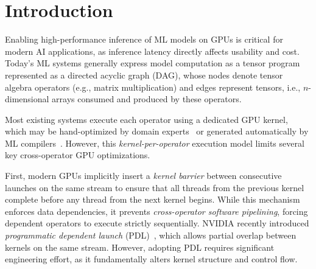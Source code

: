 \section{Introduction}
\label{sec:intro}
Enabling high-performance inference of ML models on GPUs is critical for modern AI applications, as inference latency directly affects usability and cost. Today's ML systems generally express model computation as a tensor program represented as a directed acyclic graph (DAG), whose nodes denote tensor algebra operators (e.g., matrix multiplication) and edges represent tensors, i.e., $n$-dimensional arrays consumed and produced by these operators.

Most existing systems execute each operator using a dedicated GPU kernel, which may be hand-optimized by domain experts~\cite{dao2023flash, ye2025flashinfer} or generated automatically by ML compilers~\cite{tillet2019triton, tvm, wu2025mirage}. However, this {\em kernel-per-operator} execution model limits several key cross-operator GPU optimizations.

First, modern GPUs implicitly insert a {\em kernel barrier} between consecutive launches on the same stream to ensure that all threads from the previous kernel complete before any thread from the next kernel begins. While this mechanism enforces data dependencies, it prevents {\em cross-operator software pipelining}, forcing dependent operators to execute strictly sequentially. NVIDIA recently introduced {\em programmatic dependent launch} (PDL)~\cite{nvidia-pdl}, which allows partial overlap between kernels on the same stream. However, adopting PDL requires significant engineering effort, as it fundamentally alters kernel structure and control flow.


